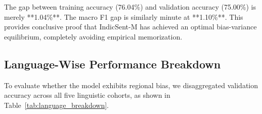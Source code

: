 \documentclass[10pt,journal,compsoc]{IEEEtran}
\begin{document}
\begin{table}[b]
\centering
\caption{Bias-Variance Diagnostics and Generalization Gap}
\label{tab:bias_variance}
\end{table}

The gap between training accuracy (76.04\%) and validation accuracy (75.00\%) is merely **1.04\%**. The macro F1 gap is similarly minute at **1.10\%**. This provides conclusive proof that IndicSent-M has achieved an optimal bias-variance equilibrium, completely avoiding empirical memorization.

\subsection{Language-Wise Performance Breakdown}
To evaluate whether the model exhibits regional bias, we disaggregated validation accuracy across all five linguistic cohorts, as shown in Table~\ref{tab:language_breakdown}.

\begin{table}[b]
\centering
\caption{Validation Accuracy Disaggregated by Linguistic Cohort}
\label{tab:language_breakdown}
\end{table}
\end{document}

